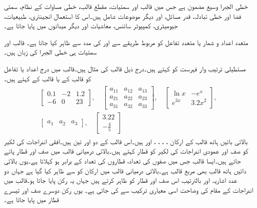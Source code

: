 خطی الجبرا وسیع مضمون ہے جس میں قالب اور سمتیات، مقطع قالب، خطی مساوات کے نظام، سمتی فضا اور  خطی تبادلہ،  قدر مسائل، اور دیگر موضوعات شامل ہیں۔اس کا استعمال انجینئری، طبیعیات، جیومیٹری، کمپیوٹر سائنس، معاشیات اور دیگر میدانوں میں پایا جاتا ہے۔

متعدد اعداد و شمار یا متعدد تفاعل کو مربوط طریقے سے  اور  کی مدد سے ظاہر کیا جاتا ہے۔ قالب اور سمتیات ہی خطی الجبرا کی زبان ہیں۔



مستطیلی ترتیب وار فہرست کو  کہتے ہیں۔درج ذیل قالب کی مثال ہیں۔قالب میں درج اعداد یا تفاعل کو قالب کے  یا قالب کے  کہتے ہیں۔ 
\begin{gather}
\begin{aligned}\label{مساوات_قالب_عمومی_قالب_الف}
\begin{bmatrix}
0.1& -2 & 1.2\\
-6 & 0 & 23
\end{bmatrix}, \quad
\begin{bmatrix}
a_{11}& a_{12} & a_{13}\\
a_{21} & a_{22} & a_{23}\\
a_{31} & a_{32} & a_{33}
\end{bmatrix}, \quad
\begin{bmatrix}
\ln x& -e^x\\
e^{3x}& 3.2x^2
\end{bmatrix},\\
\begin{bmatrix}
a_{1} & a_{2} & a_{3}
\end{bmatrix},\quad 
\begin{bmatrix}
3.22\\
-\tfrac{4}{5}
\end{bmatrix}
\end{aligned}
\end{gather}
بالائی بائیں ہاتھ قالب کے ارکان ، ، ، ،  اور  ہیں۔اس قالب کے دو  اور تین  ہیں۔افقی اندراجات کی لکیر کو صف اور عمودی اندراجات کی لکیر کو قطار کہتے ہیں۔بالائی درمیانی قالب میں  صف اور  قطار پائے جاتے ہیں۔ایسا قالب جس میں صفوں کی تعداد، قطاروں کی تعداد کے برابر ہو   کہلاتا ہے۔یوں بالائی دائیں ہاتھ قالب بھی مربع قالب ہے۔بالائی درمیانی قالب میں ارکان کو  سے ظاہر کیا گیا ہے جہاں دو عدد اشاریہ  اور  بالترتیب اس صف اور قطار کو ظاہر کرتے ہیں جہاں یہ رکن پایا جاتا ہو۔قالب میں اندراجات کے مقام کی وضاحت اسی معیاری ترکیب سے کی جاتی ہے۔ یوں  رکن دوسرے صف اور تیسرے قطار میں پایا جاتا ہے۔

